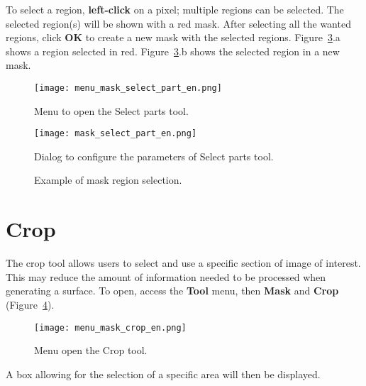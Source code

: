 To select a region, \textbf{left-click} on a pixel; multiple regions can be selected. The selected region(s) will be shown with a red mask. After selecting all the wanted regions, click \textbf{OK} to create a new mask with the selected regions. Figure~\ref{fig:mask_selected_part}.a shows a region selected in red. Figure~\ref{fig:mask_selected_part}.b shows the selected region in a new mask.

\begin{figure}[!htb]
\centering
\texttt{[image: menu\_mask\_select\_part\_en.png]}
\caption{Menu to open the Select parts tool.}
\label{fig:menu_mask_select_part}
\end{figure}

\begin{figure}[!htb]
\centering
\texttt{[image: mask\_select\_part\_en.png]}
\caption{Dialog to configure the parameters of Select parts tool.}
\label{fig:mask_select_part}
\end{figure}

\begin{figure}[!htb]
  \centering
    \qquad
  \hfill
  \caption{Example of mask region selection.}
  \label{fig:mask_selected_part}
\end{figure}

\section{Crop}

The crop tool allows users to select and use a specific section of image of interest. This may reduce the amount of information needed to be processed when generating a surface. To open, access the \textbf{Tool} menu, then \textbf{Mask} and \textbf{Crop} (Figure~\ref{fig:menu_mask_crop}).

\begin{figure}[!htb]
\centering
\texttt{[image: menu\_mask\_crop\_en.png]}
\caption{Menu open the Crop tool.}
\label{fig:menu_mask_crop}
\end{figure}

A box allowing for the selection of a specific area will then be displayed.